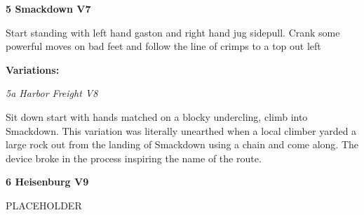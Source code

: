 \begin{multicols}{2}
					\begin{minipage}{\linewidth}	
					\label{rt:Smackdown}\colorbox{Goldenrod!50}{\textbf{5 Smackdown V7 \ding{72}   }}
					\begin{adjustwidth}{0.5cm}{}				
					Start standing with left hand gaston and right hand jug sidepull. Crank some powerful moves on bad feet and follow the line of crimps to a top out left
					\end{adjustwidth}
					\end{minipage}
						\begin{adjustwidth}{0.5cm}{}				
						\textbf{Variations:} \newline
							\begin{minipage}{\linewidth}	
							\label{vr:Harbor Freight}\colorbox{Goldenrod!50}{\emph{5a Harbor Freight V8  \ding{72}   }}
							\begin{adjustwidth}{0.5cm}{}				
							Sit down start with hands matched on a blocky undercling, climb into Smackdown. This variation was literally unearthed when a local climber yarded a large rock out from the landing of Smackdown using a chain and come along. The device broke in the process inspiring the name of the route.
							\end{adjustwidth}
							\end{minipage}
						\end{adjustwidth}
					\begin{minipage}{\linewidth}	
					\label{rt:Heisenburg}\colorbox{Goldenrod!50}{\textbf{6 Heisenburg V9  }}
					\begin{adjustwidth}{0.5cm}{}				
					PLACEHOLDER
					\end{adjustwidth}
					\end{minipage}


\end{multicols}
